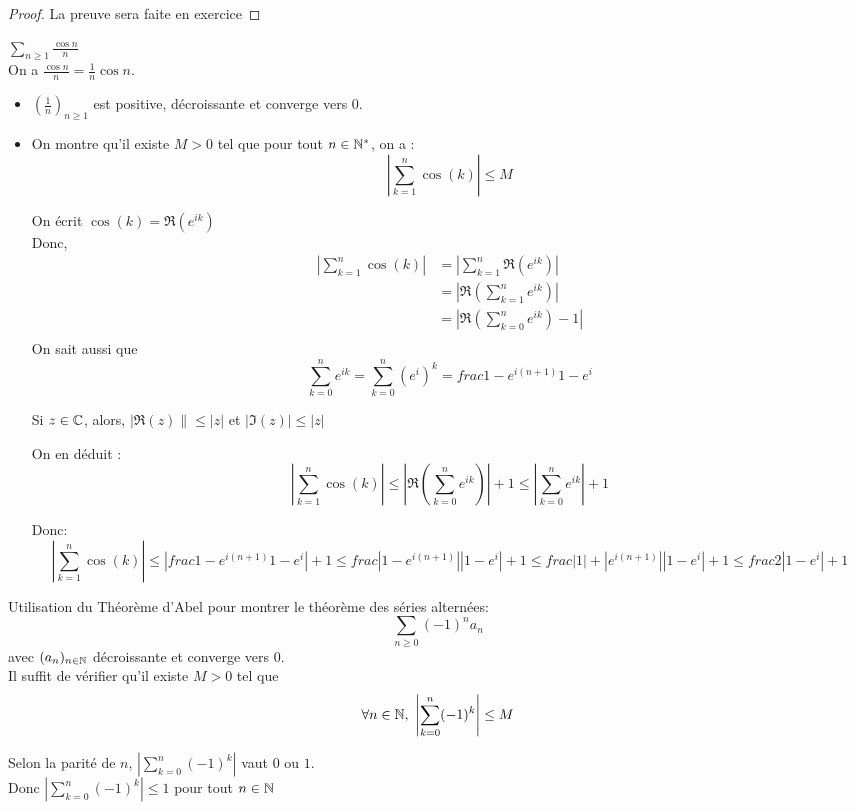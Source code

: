 \documentclass[../main.tex]{subfile}
\begin{document}
\begin{proof}
	La preuve sera faite en exercice
\end{proof}

\begin{ex}
	$\sum\limits_{n \geq 1} \frac{\cos n}{n}$\\
	On a $\frac{\cos n}{n} = \frac{1}{n} \cos n$.\\
\begin{itemize}	
	\item $(\frac{1}{n})_{n \geq 1}$ est positive, décroissante et converge vers $0$.
	\item On montre qu'il existe $M > 0$ tel que pour tout $n \in \mathbb{N}^*$, on a :
	$$\left| \sum\limits_{k =1}^n \cos(k) \right| \leq M$$

	On écrit $\cos(k) = \Re (e^{ik})$\\
	Donc, 
	$$
\begin{aligned}
	\left| \sum\limits_{k=1}^n \cos(k) \right| &= \left| \sum\limits_{k=1}^n \Re(e^{ik}) \right|\\
	&= \left| \Re(\sum\limits_{k=1}^n e^{ik}) \right|\\
	&= \left| \Re(\sum\limits_{k=0}^n e^{ik}) -1 \right|\\
\end{aligned}
	$$
	On sait aussi que 
	$$\sum\limits_{k=0}^n e^{ik} = \sum\limits_{k=0}^n (e^i)^k = frac{1 - e^{i(n+1)}}{1 - e^i}$$
\begin{rap}	
	Si $z \in \mathbb{C}$, alors, $|\Re(z)\| \leq |z|$ et $|\Im(z)| \leq |z|$
\end{rap}
	On en déduit :
	$$\left| \sum\limits_{k=1}^n \cos(k) \right| 
	\leq \left| \Re(\sum\limits_{k=0}^n e^{ik}) \right| + 1
	\leq \left| \sum\limits_{k=0}^n e^{ik} \right| + 1 $$

	Donc:
	$$\left| \sum\limits_{k=1}^n \cos(k) \right| 
	\leq \left| frac{1 - e^{i(n+1)}}{1 - e^i} \right| + 1
	\leq frac{|1 - e^{i(n+1)}|}{|1 - e^i|} + 1
	\leq frac{|1| + |e^{i(n+1)}|}{|1 - e^i|} + 1
	\leq frac{2}{|1 - e^i|} + 1
	$$
\end{itemize}
\end{ex}

\begin{exerc}	
	Utilisation du Théorème d'Abel pour montrer le théorème des séries alternées:
	$$\sum\limits_{n \geq 0} (-1)^n a_n$$
	avec $(a_n)_{n \in \mathbb{N}}$ décroissante et converge vers $0$.\\

	Il suffit de vérifier qu'il existe $M > 0$ tel que 
	$$\forall n \in \mathbb{N}, \ \left| \sum\limits_{k=0}^n (-1)^k \right| \leq M$$

	Selon la parité de $n$,	$\left| \sum\limits_{k=0}^n (-1)^k \right|$ vaut $0$ ou $1$.\\
	Donc $\left| \sum\limits_{k=0}^n (-1)^k \right| \leq 1$ pour tout $n \in \mathbb{N}$

\end{exerc}
\end{document}
